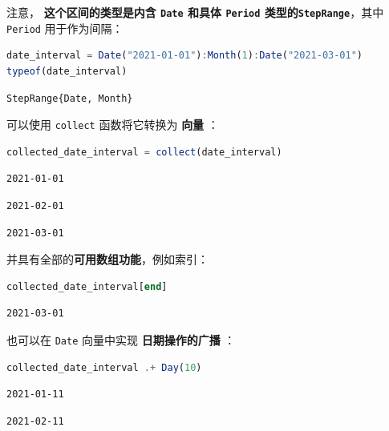 \documentclass[
  notoc %
]{tufte-book}
\newcommand{\passthrough}[1]{#1}
\begin{document}
注意， \textbf{这个区间的类型是内含 \passthrough{\lstinline!Date!}
和具体 \passthrough{\lstinline!Period!}
类型的\passthrough{\lstinline!StepRange!}}，其中
\passthrough{\lstinline!Period!} 用于作为间隔：

\begin{lstlisting}[language=Julia]
date_interval = Date("2021-01-01"):Month(1):Date("2021-03-01")
typeof(date_interval)
\end{lstlisting}

\begin{lstlisting}[language=Output]
StepRange{Date, Month}
\end{lstlisting}

可以使用 \passthrough{\lstinline!collect!} 函数将它转换为 \textbf{向量}
：

\begin{lstlisting}[language=Julia]
collected_date_interval = collect(date_interval)
\end{lstlisting}

\begin{lstlisting}[language=Output]
2021-01-01
\end{lstlisting}

\begin{lstlisting}[language=Output]
2021-02-01
\end{lstlisting}

\begin{lstlisting}[language=Output]
2021-03-01
\end{lstlisting}

并具有全部的\textbf{可用数组功能}，例如索引：

\begin{lstlisting}[language=Julia]
collected_date_interval[end]
\end{lstlisting}

\begin{lstlisting}[language=Output]
2021-03-01
\end{lstlisting}

也可以在 \passthrough{\lstinline!Date!} 向量中实现
\textbf{日期操作的广播} ：

\begin{lstlisting}[language=Julia]
collected_date_interval .+ Day(10)
\end{lstlisting}

\begin{lstlisting}[language=Output]
2021-01-11
\end{lstlisting}

\begin{lstlisting}[language=Output]
2021-02-11
\end{lstlisting}
\end{document}
